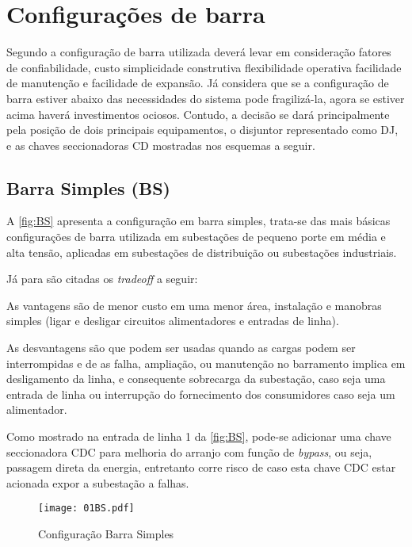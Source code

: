 	\section{Configurações de barra}
		Segundo  a configuração de barra utilizada deverá levar em consideração fatores de confiabilidade, custo simplicidade construtiva flexibilidade operativa facilidade de manutenção e facilidade de expansão. Já  considera que se a configuração de barra estiver abaixo das necessidades do sistema pode fragilizá-la, agora se estiver acima haverá investimentos ociosos. Contudo, a decisão se dará principalmente pela posição de dois principais equipamentos, o disjuntor representado como DJ, e as chaves seccionadoras CD mostradas nos esquemas a seguir.
		\subsection{Barra Simples (BS)}
			A \autoref{fig:BS} apresenta a configuração em barra simples, trata-se das mais básicas configurações de barra utilizada em subestações de pequeno porte em média e alta tensão, aplicadas em subestações de distribuição ou subestações industriais.\par
			Já para  são citadas os \textit{tradeoff} a seguir:\par
			As vantagens são de menor custo em uma menor área, instalação e manobras simples (ligar e desligar circuitos alimentadores e entradas de linha).\par
			As desvantagens são que podem ser usadas quando as cargas podem ser interrompidas e de as falha, ampliação, ou manutenção no barramento implica em desligamento da linha, e consequente sobrecarga da subestação, caso seja uma entrada de linha ou interrupção do fornecimento dos consumidores caso seja um alimentador.\par
			Como mostrado na entrada de linha 1 da \autoref{fig:BS}, pode-se adicionar uma chave seccionadora CDC para melhoria do arranjo com função de \textit{bypass}, ou seja, passagem direta da energia, entretanto corre risco de caso esta chave CDC estar acionada expor a subestação a falhas.\par 
			\begin{figure}[!htb]
				\caption{Configuração Barra Simples}
				\centering
				\texttt{[image: 01BS.pdf]}
				\label{fig:BS}
				\end{figure}
